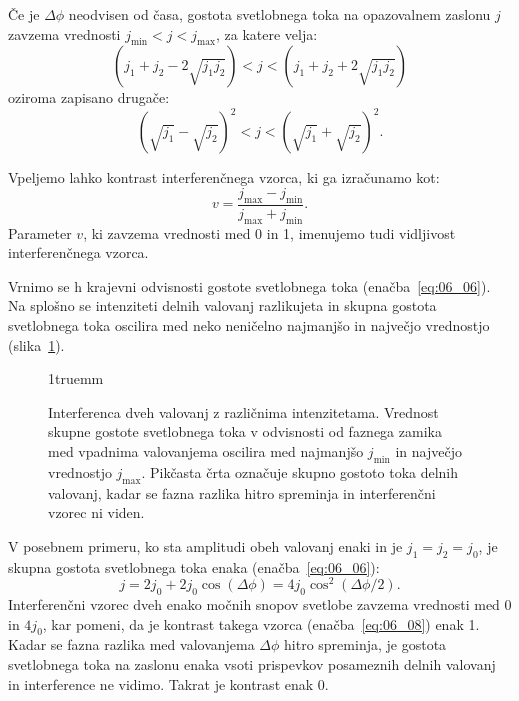 Če je $\Delta \phi$ neodvisen od časa, gostota svetlobnega toka na opazovalnem zaslonu $j$
zavzema vrednosti $j_\mathrm{min}<j<j_\mathrm{max}$, za katere velja:
\begin{equation}
\left(j_1+j_2 -2\sqrt{j_1 j_2}\right) < j < \left(j_1+j_2 +2\sqrt{j_1 j_2}\right)
\label{eq:06_07}
\end{equation}
oziroma zapisano drugače:
\begin{equation}
\left(\sqrt{j_1}- \sqrt{j_2}\right)^2 < j < \left(\sqrt{j_1} +\sqrt{j_2}\right)^2\!\!.
\label{eq:06_07a}
\end{equation}

\begin{remark}
Vpeljemo lahko kontrast interferenčnega vzorca, ki ga izračunamo kot:
\begin{equation}
v = \frac{j_\mathrm{max}- j_\mathrm{min}}{j_\mathrm{max}+ j_\mathrm{min}}.
\label{eq:06_08}
\end{equation}
Parameter $v$, ki zavzema vrednosti med 0 in 1, imenujemo tudi
vidljivost interferenčnega vzorca.
\end{remark}

Vrnimo se h krajevni odvisnosti gostote svetlobnega toka (enačba~\ref{eq:06_06}). Na
splošno se intenziteti delnih valovanj razlikujeta in skupna gostota svetlobnega
toka oscilira med neko neničelno najmanjšo in največjo vrednostjo (slika~\ref{fig:06_kontrast}).
\begin{figure}[!ht]
\centering
\def\svgwidth{85truemm} 

\vglue1truemm
\caption{Interferenca dveh valovanj z različnima intenzitetama. 
Vrednost skupne gostote svetlobnega toka v odvisnosti od faznega 
zamika med vpadnima valovanjema oscilira med najmanjšo $j_\mathrm{min}$ 
in največjo vrednostjo $j_\mathrm{max}$. Pikčasta črta označuje skupno
gostoto toka delnih valovanj, kadar se fazna razlika hitro spreminja
in interferenčni vzorec ni viden.}
\label{fig:06_kontrast}
\end{figure}

V posebnem primeru, ko sta amplitudi obeh valovanj enaki in je $j_1 = j_2 = j_0$, 
je skupna gostota svetlobnega toka enaka (enačba~\ref{eq:06_06}):
\begin{equation}
j = 2j_0 + 2j_0 \cos (\Delta \phi) = 4j_0 \cos^2 (\Delta \phi/2).
\label{eq:06_09}
\end{equation}
Interferenčni vzorec dveh enako močnih snopov svetlobe zavzema vrednosti med 0 
in $4j_0$, kar pomeni, da je kontrast takega vzorca (enačba~\ref{eq:06_08}) enak 1. 
Kadar se fazna razlika med valovanjema $\Delta \phi$ hitro spreminja,
je gostota svetlobnega toka na zaslonu enaka vsoti prispevkov posameznih 
delnih valovanj in interference ne vidimo. Takrat je kontrast enak 0. 

